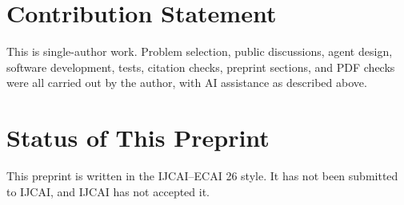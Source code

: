 \documentclass{article}
\begin{document}
\section*{Contribution Statement}

This is single-author work. Problem selection, public discussions, agent
design, software development, tests, citation checks, preprint sections, and
PDF checks were all carried out by the author, with AI assistance as described
above.

\section*{Status of This Preprint}

This preprint is written in the IJCAI--ECAI 26 style. It has not been submitted
to IJCAI, and IJCAI has not accepted it.



\end{document}
